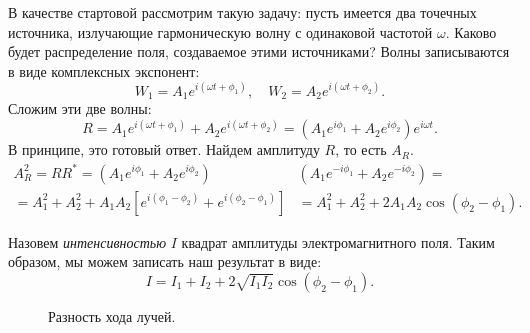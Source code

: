 \documentclass[11pt,a4paper]{article}
\numberwithin{equation}{section}
\begin{document}
В качестве стартовой рассмотрим такую задачу: пусть имеется два точечных источника, излучающие гармоническую волну с одинаковой частотой $\omega$. Каково будет распределение поля, создаваемое этими источниками?
Волны записываются в виде комплексных экспонент:
\begin{equation}
W_1=A_1 e^{i(\omega t + \phi_1)}, \quad W_2 = A_2 e^{i(\omega t + \phi_2)}.
\end{equation}
Сложим эти две волны:
\begin{equation}
R = A_1 e^{i(\omega t + \phi_1)} + A_2 e^{i(\omega t + \phi_2)} = (A_1 e^{i \phi_1} + A_2 e^{i \phi_2} ) e^{i \omega t}.
\end{equation}
В принципе, это готовый ответ. Найдем амплитуду $R$, то есть $A_R$. 
\begin{equation}
\begin{split}
A_R^2 = R R^{*} = (A_1 e^{i \phi_1} + A_2 e^{i \phi_2} ) & (A_1 e^{-i \phi_1} + A_2 e^{-i \phi_2} ) =\\
=A_1^2 + A_2^2 + A_1 A_2 \left[ e^{i (\phi_1 - \phi_2)} + e^{i (\phi_2 - \phi_1)} \right] &= A_1^2 + A_2^2 + 2 A_1 A_2 \cos (\phi_2 - \phi_1).
\end{split}
\end{equation}

Назовем \textit{интенсивностью} $I$ квадрат амплитуды электромагнитного поля. Таким образом, мы можем записать наш результат в виде:
\begin{equation} \label{eq:sum_waves}
I = I_1 + I_2 + 2\sqrt{I_1 I_2} \cos (\phi_2 - \phi_1).
\end{equation}

\begin{figure}[h]
  \centering
  \caption{Разность хода лучей.}
  \label{fig:two_paths}
\end{figure}
\end{document}

